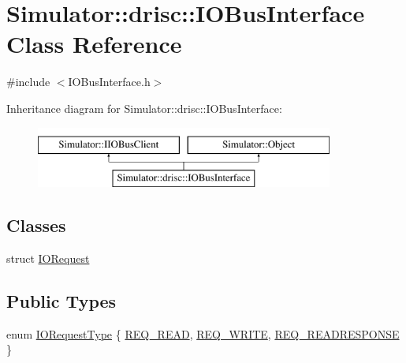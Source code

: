 \hypertarget{class_simulator_1_1drisc_1_1_i_o_bus_interface}{\section{Simulator\+:\+:drisc\+:\+:I\+O\+Bus\+Interface Class Reference}
\label{class_simulator_1_1drisc_1_1_i_o_bus_interface}
}


{\ttfamily \#include $<$I\+O\+Bus\+Interface.\+h$>$}

Inheritance diagram for Simulator\+:\+:drisc\+:\+:I\+O\+Bus\+Interface\+:\begin{figure}[H]
\begin{center}
\leavevmode
\includegraphics[height=2.000000cm]{class_simulator_1_1drisc_1_1_i_o_bus_interface}
\end{center}
\end{figure}
\subsection*{Classes}
\begin{DoxyCompactItemize}
\item 
struct \hyperlink{struct_simulator_1_1drisc_1_1_i_o_bus_interface_1_1_i_o_request}{I\+O\+Request}
\end{DoxyCompactItemize}
\subsection*{Public Types}
\begin{DoxyCompactItemize}
\item 
enum \hyperlink{class_simulator_1_1drisc_1_1_i_o_bus_interface_a229424ad6cafaf8f1fd82dfd86eac794}{I\+O\+Request\+Type} \{ \hyperlink{class_simulator_1_1drisc_1_1_i_o_bus_interface_a229424ad6cafaf8f1fd82dfd86eac794a02bebe5dbc4b88b1c9dece1778003123}{R\+E\+Q\+\_\+\+R\+E\+A\+D}, 
\hyperlink{class_simulator_1_1drisc_1_1_i_o_bus_interface_a229424ad6cafaf8f1fd82dfd86eac794abf8936484506fcbe3b213a67bd416a42}{R\+E\+Q\+\_\+\+W\+R\+I\+T\+E}, 
\hyperlink{class_simulator_1_1drisc_1_1_i_o_bus_interface_a229424ad6cafaf8f1fd82dfd86eac794af5212e120cbd5941e74680459d06a0b4}{R\+E\+Q\+\_\+\+R\+E\+A\+D\+R\+E\+S\+P\+O\+N\+S\+E}
 \}
\end{DoxyCompactItemize}

